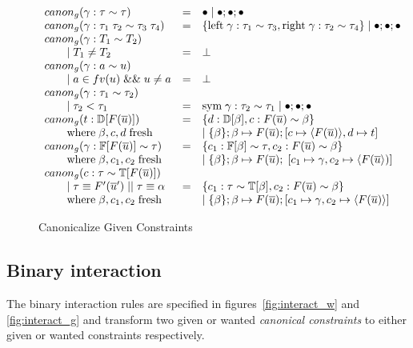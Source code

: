 \begin{figure}
\small
{}
\[
\begin{array}{l c l}
canon_g(\gamma : \tau \sim \tau) &=& \bullet \mid \bullet ; \bullet ; \bullet
\\
canon_g(\gamma : \tau_1 \; \tau_2 \sim \tau_3 \; \tau_4) &=& \{ \text{left} \;
\gamma : \tau_1 \sim \tau_3, \text{right} \; \gamma : \tau_2 \sim \tau_4\} \mid
\bullet ; \bullet ; \bullet
\\
canon_g(\gamma : T_1 \sim T_2)
\\ \qquad \mid T_1 \neq T_2 &=& \bot
\\
canon_g(\gamma : a \sim u)
\\
\qquad \mid a \in fv(u) \; \&\& \; u \neq a &=& \bot
\\
canon_g(\gamma : \tau_1 \sim \tau_2)
\\ \qquad \mid \tau_2 < \tau_1 &=& \text{sym} \; \gamma : \tau_2 \sim \tau_1
\mid \bullet ; \bullet ; \bullet
\\
canon_g(t : \mathbb{D}[F(\overline{u})]) &=& \{ d : \mathbb{D}[\beta], c :
F(\overline{u}) \sim \beta\}
\\ \qquad \text{where} \; \beta, c, d \; \text{fresh} && \mid \{\beta\} ; \beta \mapsto F(\overline{u}) ; [c
\mapsto \langle F(\overline{u}) \rangle, d \mapsto t]
\\
canon_g(\gamma : \mathbb{F}[F(\overline{u})] \sim \tau) &=& \{ c_1 :
\mathbb{F}[\beta] \sim \tau, c_2 : F(\overline{u}) \sim \beta\}
\\ \qquad \text{where} \; \beta, c_1, c_2 \; \text{fresh} && \mid \{ \beta \} ; \beta \mapsto F(\overline{u}) ; \; [c_1 \mapsto \gamma,
c_2 \mapsto \langle F(\overline{u}  \rangle)]
\\
canon_g(c : \tau \sim \mathbb{T}[F(\overline{u})])
\\ \qquad \mid \tau \equiv F'(\overline{u}') \; || \; \tau \equiv \alpha &=&
\{ c_1 : \tau \sim \mathbb{T}[\beta], c_2 : F(\overline{u}) \sim \beta\}
\\ \qquad \text{where} \; \beta, c_1, c_2 \; \text{fresh} && \mid \{\beta\} ; \beta \mapsto F(\overline{u}) ; [c_1 \mapsto \gamma, c_2
\mapsto \langle F(\overline{u}) \rangle]
\end{array}
\]
\caption{Canonicalize Given Constraints}
\label{fig:canon_g}
\end{figure}

\subsection{Binary interaction}
\label{sec:binary-interaction}
The binary interaction rules are specified in figures~\ref{fig:interact_w} and
\ref{fig:interact_g} and transform two given or wanted \textit{canonical
constraints} to either given or wanted constraints respectively.

